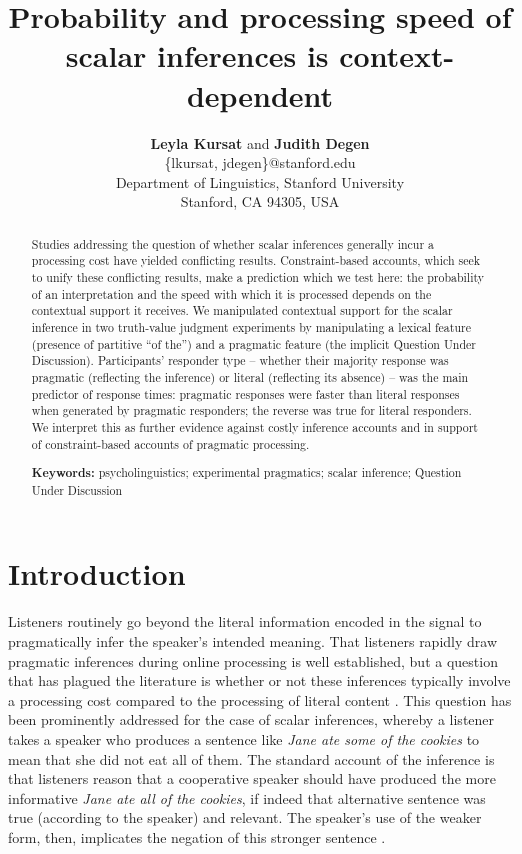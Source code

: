 \documentclass[10pt,letterpaper]{article}
\title{Probability and processing speed of scalar inferences is context-dependent}
\author{{\large \textbf{Leyla Kursat}  {\normalfont and} \textbf{Judith Degen}}  \\
 \{lkursat, jdegen\}@stanford.edu \\
  Department of Linguistics, Stanford University \\
  Stanford, CA 94305, USA}
\begin{document}
\maketitle


\begin{abstract}

Studies addressing the question of whether scalar inferences generally incur a processing cost  have yielded conflicting results. Constraint-based accounts, which seek to unify these conflicting results, make a prediction which we test here: the probability of an interpretation and the speed with which it is processed depends on the contextual support it receives. We manipulated contextual support for the scalar inference in two truth-value judgment experiments  by manipulating a lexical feature (presence of partitive ``of the'') and a pragmatic feature (the implicit Question Under Discussion). Participants' responder type -- whether their majority response was pragmatic (reflecting the inference) or literal (reflecting its absence) -- was the main predictor of response times: pragmatic responses  were faster than literal responses when generated by pragmatic responders; the reverse was true for literal responders. We interpret this as further evidence against costly inference accounts and in support of constraint-based accounts of pragmatic processing.

\textbf{Keywords:} psycholinguistics; experimental pragmatics; scalar inference; Question Under Discussion

\end{abstract}

\section{Introduction}

Listeners routinely go beyond the literal information encoded in the signal to pragmatically infer the speaker's intended meaning. That listeners rapidly draw pragmatic inferences during online processing is well established, but a question that has plagued the literature is whether or not these inferences typically involve a processing cost compared to the processing of literal content \cite{BottNoveck2004,BrehenyEtAl2006,HuangSnedeker2009,HuangSnedeker2011,Grodner2010,Breheny2013,DegenTanenhaus2016,DeNeysSchaeken2007,TomlinsonEtAl2012}. This question has been prominently addressed for the case of scalar inferences, whereby a listener takes a speaker who produces a sentence like \textit{Jane ate some of the cookies} to mean that she did not eat all of them. The standard account of the inference is that listeners reason that a cooperative speaker should have produced the more informative \emph{Jane ate all of the cookies}, if indeed that alternative sentence was true (according to the speaker) and relevant. The speaker's use of the weaker form, then, implicates the negation of this stronger sentence \cite{Grice1975}.
\end{document}
